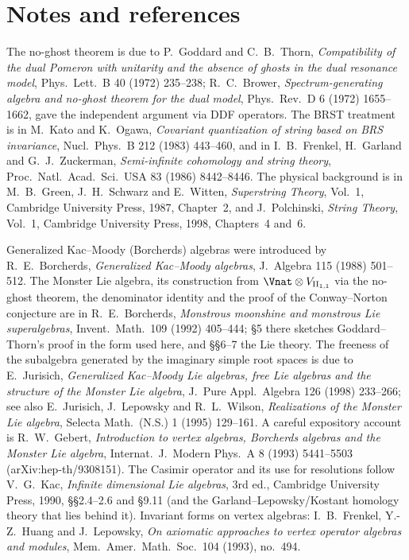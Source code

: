 \section{Notes and references}\label{ch18:sec:notes}

The no-ghost theorem is due to P.~Goddard and C.~B.~Thorn, \emph{Compatibility of the dual Pomeron with unitarity and the absence of
ghosts in the dual resonance model}, Phys.\ Lett.\ B 40 (1972) 235--238; R.~C.~Brower, \emph{Spectrum-generating algebra and no-ghost
theorem for the dual model}, Phys.\ Rev.\ D 6 (1972) 1655--1662, gave the independent argument via DDF operators.  The BRST
treatment is in M.~Kato and K.~Ogawa, \emph{Covariant quantization of string based on BRS invariance}, Nucl.\ Phys.\ B 212 (1983) 443--460,
and in I.~B.~Frenkel, H.~Garland and G.~J.~Zuckerman, \emph{Semi-infinite cohomology and string theory}, Proc.\ Natl.\ Acad.\ Sci.\ USA 83
(1986) 8442--8446.  The physical background is in M.~B.~Green, J.~H.~Schwarz and E.~Witten, \emph{Superstring Theory}, Vol.~1, Cambridge
University Press, 1987, Chapter~2, and J.~Polchinski, \emph{String Theory}, Vol.~1, Cambridge University Press, 1998, Chapters~4 and~6.

Generalized Kac--Moody (Borcherds) algebras were introduced by R.~E.~Borcherds, \emph{Generalized Kac--Moody algebras}, J.\ Algebra 115
(1988) 501--512.  The Monster Lie algebra, its construction from $\Vnat\otimes V_{\chXVIIIII}$ via the no-ghost theorem, the denominator
identity and the proof of the Conway--Norton conjecture are in R.~E.~Borcherds, \emph{Monstrous moonshine and monstrous Lie superalgebras},
Invent.\ Math.\ 109 (1992) 405--444; §5 there sketches Goddard--Thorn's proof in the form used here, and §§6--7 the Lie theory.  The
freeness of the subalgebra generated by the imaginary simple root spaces is due to E.~Jurisich, \emph{Generalized Kac--Moody Lie algebras,
free Lie algebras and the structure of the Monster Lie algebra}, J.\ Pure Appl.\ Algebra 126 (1998) 233--266; see also E.~Jurisich,
J.~Lepowsky and R.~L.~Wilson, \emph{Realizations of the Monster Lie algebra}, Selecta Math.\ (N.S.) 1 (1995) 129--161.  A careful expository
account is R.~W.~Gebert, \emph{Introduction to vertex algebras, Borcherds algebras and the Monster Lie algebra}, Internat.\ J.\ Modern Phys.\
A 8 (1993) 5441--5503 (arXiv:hep-th/9308151).  The Casimir operator and its use for resolutions follow V.~G.~Kac, \emph{Infinite dimensional
Lie algebras}, 3rd ed., Cambridge University Press, 1990, §§2.4--2.6 and §9.11 (and the Garland--Lepowsky/Kostant homology theory that
lies behind it).  Invariant forms on vertex algebras: I.~B.~Frenkel, Y.-Z.~Huang and J.~Lepowsky, \emph{On axiomatic approaches to vertex
operator algebras and modules}, Mem.\ Amer.\ Math.\ Soc.\ 104 (1993), no.~494.

